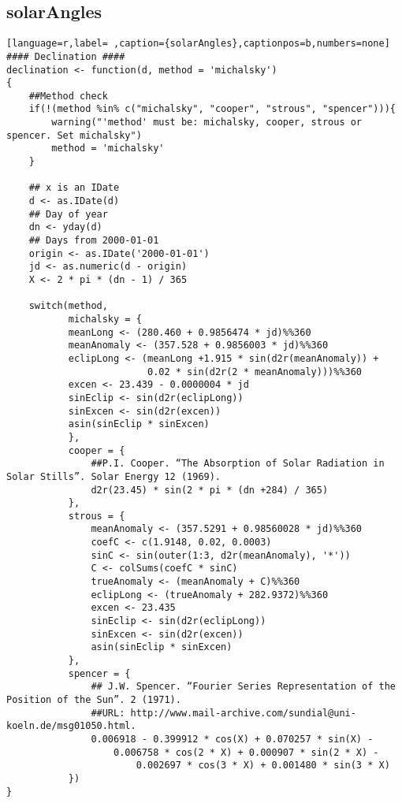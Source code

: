 \subsection{solarAngles}
\label{sec:org92e1127}
\label{subsec:solarangles}
\begin{lstlisting}[language=r,label= ,caption={solarAngles},captionpos=b,numbers=none]
#### Declination ####
declination <- function(d, method = 'michalsky')
{
    ##Method check
    if(!(method %in% c("michalsky", "cooper", "strous", "spencer"))){
        warning("'method' must be: michalsky, cooper, strous or spencer. Set michalsky")
        method = 'michalsky'
    }

    ## x is an IDate
    d <- as.IDate(d)
    ## Day of year
    dn <- yday(d)
    ## Days from 2000-01-01
    origin <- as.IDate('2000-01-01')
    jd <- as.numeric(d - origin)
    X <- 2 * pi * (dn - 1) / 365

    switch(method,
           michalsky = {
           meanLong <- (280.460 + 0.9856474 * jd)%%360
           meanAnomaly <- (357.528 + 0.9856003 * jd)%%360
           eclipLong <- (meanLong +1.915 * sin(d2r(meanAnomaly)) +
                         0.02 * sin(d2r(2 * meanAnomaly)))%%360
           excen <- 23.439 - 0.0000004 * jd
           sinEclip <- sin(d2r(eclipLong))
           sinExcen <- sin(d2r(excen))
           asin(sinEclip * sinExcen)
           },
           cooper = {
               ##P.I. Cooper. “The Absorption of Solar Radiation in Solar Stills”. Solar Energy 12 (1969).
               d2r(23.45) * sin(2 * pi * (dn +284) / 365)
           },
           strous = {
               meanAnomaly <- (357.5291 + 0.98560028 * jd)%%360
               coefC <- c(1.9148, 0.02, 0.0003)
               sinC <- sin(outer(1:3, d2r(meanAnomaly), '*'))
               C <- colSums(coefC * sinC)
               trueAnomaly <- (meanAnomaly + C)%%360
               eclipLong <- (trueAnomaly + 282.9372)%%360
               excen <- 23.435
               sinEclip <- sin(d2r(eclipLong))
               sinExcen <- sin(d2r(excen))
               asin(sinEclip * sinExcen)
           },
           spencer = {
               ## J.W. Spencer. “Fourier Series Representation of the Position of the Sun”. 2 (1971).
               ##URL: http://www.mail-archive.com/sundial@uni-koeln.de/msg01050.html.
               0.006918 - 0.399912 * cos(X) + 0.070257 * sin(X) -
                   0.006758 * cos(2 * X) + 0.000907 * sin(2 * X) -
                       0.002697 * cos(3 * X) + 0.001480 * sin(3 * X)           
           })
}



\end{lstlisting}
